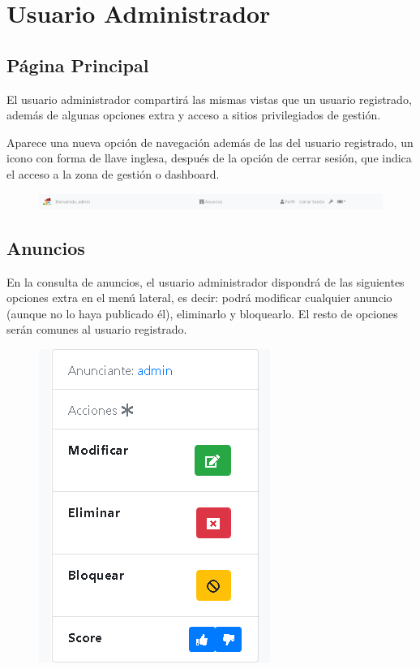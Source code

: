 \section{Usuario Administrador}

\subsection{P\'{a}gina Principal}
El usuario administrador compartir\'{a} las mismas vistas que un usuario registrado, adem\'{a}s de algunas opciones extra y acceso a sitios privilegiados de gesti\'{o}n.

Aparece una nueva opci\'{o}n de navegaci\'{o}n adem\'{a}s de las del usuario registrado, un icono con forma de llave inglesa, despu\'{e}s de la opci\'{o}n de cerrar sesi\'{o}n, que indica el acceso a la zona de gesti\'{o}n o dashboard.

\begin{figure}[h!]
\centering
\includegraphics[width=1\textwidth]{Img/ManualUsuario/ADMIN_MENU.png}
\end{figure}

\subsection{Anuncios}
En la consulta de anuncios, el usuario administrador dispondr\'{a} de las siguientes opciones extra en el men\'{u} lateral, es decir: podr\'{a} modificar cualquier anuncio (aunque no lo haya publicado \'{e}l), eliminarlo y bloquearlo. El resto de opciones ser\'{a}n comunes al usuario registrado.

\begin{figure}[h!]
\centering
\includegraphics[width=.3\textwidth]{Img/ManualUsuario/ADS_ADMIN__PANEL.png}
\end{figure}

